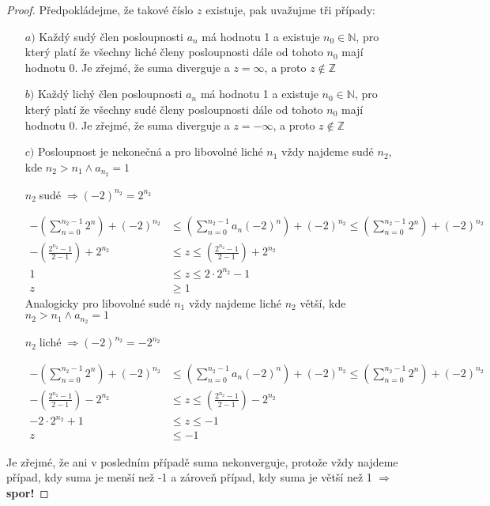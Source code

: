 \documentclass[czech,bachelor,dept470,male]{diploma}
\begin{document}
\begin{proof}
	Předpokládejme, že takové číslo $z$ existuje, pak uvažujme tři případy:
	\begin{itemize}
		\item[$a)$]
		Každý sudý člen posloupnosti $a_n$ má hodnotu 1 a existuje $n_0\in\mathbb{N}$, pro který platí že všechny liché členy posloupnosti dále od tohoto $n_0$ mají hodnotu 0.
		Je zřejmé, že suma diverguje a $z=\infty$, a proto $z \notin \mathbb{Z}$
		\item[$b)$]Každý lichý člen posloupnosti $a_n$ má hodnotu 1 a existuje $n_0\in\mathbb{N}$, pro který platí že všechny sudé členy posloupnosti dále od tohoto $n_0$ mají hodnotu 0.
		Je zřejmé, že suma diverguje a $z=-\infty$, a proto $z \notin \mathbb{Z}$
		\item[$c)$] Posloupnost je nekonečná a pro libovolné liché $n_1$ vždy najdeme sudé $n_2$, kde $ n_2>n_1 \land a_{n_2}=1$
		\begin{center}$ n_2 \; $sudé$ \; \Rightarrow (-2)^{n_2} = 2^{n_2}$\end{center}
		\begin{align}
		-\left(\sum_{n=0}^{n_2-1}2^n\right)+(-2)^{n_2}&\leq\left(\sum_{n=0}^{n_2-1}a_n(-2)^n\right)+(-2)^{n_2}\leq\left(\sum_{n=0}^{n_2-1}2^n\right)+(-2)^{n_2}\nonumber\\
		-\left(\frac{2^{n_2}-1}{2-1}\right)+2^{n_2}&\leq z \leq\left(\frac{2^{n_2}-1}{2-1} \right)+2^{n_2}\nonumber\\
		1&\leq z\leq 2\cdot2^{n_2}-1\nonumber\\
		z&\ge 1\nonumber
		\end{align}
		Analogicky pro libovolné sudé $n_1$ vždy najdeme liché $n_2$ větší, kde $ n_2>n_1 \land a_{n_2}=1$
		\begin{center}$ n_2 \; $liché$ \; \Rightarrow (-2)^{n_2} = -2^{n_2}$\end{center}
		\begin{align}
		-\left(\sum_{n=0}^{n_2-1}2^n\right)+(-2)^{n_2}&\leq \left(\sum_{n=0}^{n_2-1}a_n(-2)^n\right)+(-2)^{n_2}  \leq\left(\sum_{n=0}^{n_2-1}2^n\right)+(-2)^{n_2}\nonumber\\
		-\left(\frac{2^{n_2}-1}{2-1}\right)-2^{n_2}&\leq   z \leq\left(\frac{2^{n_2}-1}{2-1} \right)-2^{n_2}\nonumber\\
		-2\cdot2^{n_2}+1&\leq z\leq -1\nonumber\\
		z&\le-1\nonumber
		\end{align}
		
	\end{itemize}
	Je zřejmé, že ani v posledním případě suma nekonverguje, protože vždy najdeme případ, kdy suma je menší než -1 a zároveň případ, kdy suma je větší než 1 $\Rightarrow$ \textbf{spor!}
	
\end{proof}
\end{document}
